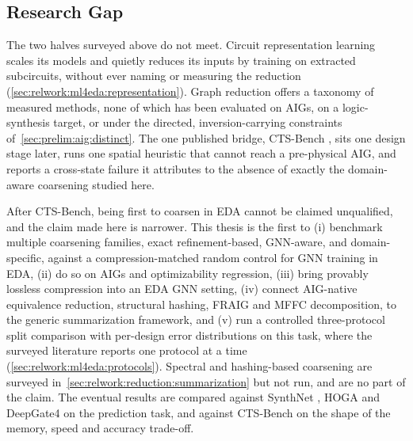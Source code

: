 \subsection{Research Gap}
\label{sec:relwork:gap}
The two halves surveyed above do not meet. Circuit representation learning scales its
models and quietly reduces its inputs by training on extracted subcircuits, without ever
naming or measuring the reduction (\ref{sec:relwork:ml4eda:representation}). Graph
reduction offers a taxonomy of measured methods, none of which has been evaluated on
AIGs, on a logic-synthesis target, or under the directed, inversion-carrying constraints
of~\ref{sec:prelim:aig:distinct}. The one published bridge, CTS-Bench
\citep{cts_bench2026}, sits one design stage later, runs one spatial heuristic that
cannot reach a pre-physical AIG, and reports a cross-state failure it attributes to the
absence of exactly the domain-aware coarsening studied here.

After CTS-Bench, being first to coarsen in EDA cannot be claimed unqualified, and the
claim made here is narrower. This thesis is the first to (i) benchmark multiple
coarsening families, exact refinement-based, GNN-aware, and domain-specific, against a
compression-matched random control for GNN training in EDA, (ii) do so on AIGs and
optimizability regression, (iii) bring provably lossless compression into an EDA GNN
setting, (iv) connect AIG-native equivalence reduction, structural hashing, FRAIG and
MFFC decomposition, to the generic summarization framework, and (v) run a controlled
three-protocol split comparison with per-design error distributions on this task, where
the surveyed literature reports one protocol at a time
(\ref{sec:relwork:ml4eda:protocols}). Spectral and hashing-based coarsening are surveyed
in~\ref{sec:relwork:reduction:summarization} but not run, and are no part of the claim.
The eventual results are compared against SynthNet \citep{chowdhury2021openabc}, HOGA
\citep{deng2024hoga} and DeepGate4 \citep{deepgate4_2025} on the prediction task, and
against CTS-Bench \citep{cts_bench2026} on the shape of the memory, speed and accuracy
trade-off.
